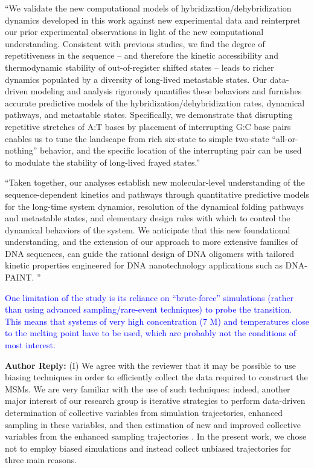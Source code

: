 \documentclass[11pt,a4paper]{letter} %
\begin{document}
``We validate the new computational models of hybridization/dehybridization dynamics developed in this work against new experimental data and reinterpret our prior experimental observations in light of the new computational understanding. Consistent with previous studies, \citep{Hinckley2014Coarse-grainedEffects,Romano2013DNADependence,Araque2016LatticeCooperativity} we find the degree of repetitiveness in the sequence -- and therefore the kinetic accessibility and thermodynamic stability of out-of-register shifted states -- leads to richer dynamics populated by a diversity of long-lived metastable states. Our data-driven modeling and analysis rigorously quantifies these behaviors and furnishes accurate predictive models of the hybridization/dehybridization rates, dynamical pathways, and metastable states. Specifically, we demonstrate that disrupting repetitive stretches of A:T bases by placement of interrupting G:C base pairs enables us to tune the landscape from rich six-state to simple two-state ``all-or-nothing'' behavior, and the specific location of the interrupting pair can be used to modulate the stability of long-lived frayed states.''

``Taken together, our analyses establish new molecular-level understanding of the sequence-dependent kinetics and pathways through quantitative predictive models for the long-time system dynamics, resolution of the dynamical folding pathways and metastable states, and elementary design rules with which to control the dynamical behaviors of the system. We anticipate that this new foundational understanding, and the extension of our approach to more extensive families of DNA sequences, can guide the rational design of DNA oligomers with tailored kinetic properties engineered for DNA nanotechnology applications such as DNA-PAINT. \citep{Shah2019, Strauss2020UpDNA-PAINT}'' 




\textcolor{blue}{One limitation of the study is its reliance on ``brute-force'' simulations (rather than using advanced sampling/rare-event techniques) to probe the transition. This means that systems of very high concentration (7 M) and temperatures close to the melting point have to be used, which are probably not the conditions of most interest.}

\textbf{Author Reply:}    (I) We agree with the reviewer that it may be possible to use biasing techniques in order to efficiently collect the data required to construct the MSMs. We are very familiar with the use of such techniques: indeed, another major interest of our research group is iterative strategies to perform data-driven determination of collective variables from simulation trajectories, enhanced sampling in these variables, and then estimation of new and improved collective variables from the enhanced sampling trajectories \citep{Sidky2020MolecularSimulators, Sidky2020MachineSimulation, Chen2019CapabilitiesSystems, Chen2019NonlinearVAMPnets, Phys2018CollectiveDesign, Chen2018MolecularExploration}. In the present work, we chose not to employ biased simulations and instead collect unbiased trajectories for three main reasons. 
\end{document}
